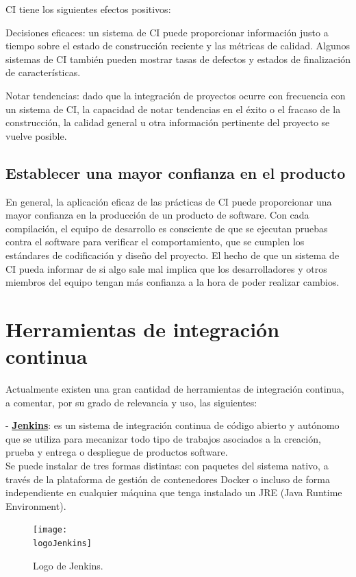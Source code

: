 CI tiene los siguientes efectos positivos:
\begin{compactitem}
    \item Decisiones eficaces: un sistema de CI puede proporcionar información justo a tiempo sobre el estado de construcción reciente y las métricas de calidad. Algunos sistemas de CI también pueden mostrar tasas de defectos y estados de finalización de características.
    \item Notar tendencias: dado que la integración de proyectos ocurre con frecuencia con un sistema de CI, la capacidad de notar tendencias en el éxito o el fracaso de la construcción, la calidad general u otra información pertinente del proyecto se vuelve posible.
\end{compactitem}
\subsection{Establecer una mayor confianza en el producto}
En general, la aplicación eficaz de las prácticas de CI puede proporcionar una mayor confianza en la producción de un producto de software. Con cada compilación, el equipo de desarrollo es consciente de que se ejecutan pruebas contra el software para verificar el comportamiento, que se cumplen los estándares de codificación y diseño del proyecto. El hecho de que un sistema de CI pueda informar de si algo sale mal implica que los desarrolladores y otros miembros del equipo tengan más confianza a la hora de poder realizar cambios.

\section{Herramientas de integración continua}
Actualmente existen una gran cantidad de herramientas de integración continua, a comentar, por su grado de relevancia y uso, las siguientes:

- \textbf{\underline{Jenkins}}: es un sistema de integración continua de código abierto y autónomo que se utiliza para mecanizar todo tipo de trabajos asociados a la creación, prueba y entrega o despliegue de productos software.\\
Se puede instalar de tres formas distintas: con paquetes del sistema nativo, a través de la plataforma de gestión de contenedores Docker o incluso de forma independiente en cualquier máquina que tenga instalado un JRE (Java Runtime Environment).
\begin{figure}[h]
    \centering
    \texttt{[image: \\logoJenkins]}
    \caption{Logo de Jenkins.}
\end{figure}

